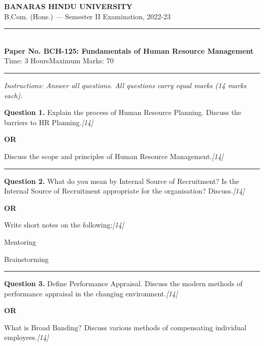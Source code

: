 \documentclass[11pt,a4paper]{article}
\newcommand{\pts}[1]{\hfill   \textit{[#1]}}
\begin{document}
\begin{center}
  {\large\bfseries BANARAS HINDU UNIVERSITY}\\[2pt]
  {\normalsize B.Com. (Hons.) --- Semester II Examination, 2022-23}\\[6pt]
  \rule{0.8\linewidth}{0.5pt}\\[6pt]
  {\large\bfseries Paper No. BCH-125: Fundamentals of Human Resource Management}\\[4pt]
  {\normalsize Time: 3 Hours\hfill Maximum Marks: 70}
\end{center}

\rule{\linewidth}{0.4pt}

\smallskip



\noindent   \textit{Instructions: Answer all questions. All questions carry equal marks (14 marks each).}

\bigskip




\noindent   \textbf{Question 1.}
Explain the process of Human Resource Planning. Discuss the barriers to HR Planning.\pts{14}

\centerline{   \textbf{OR}}

Discuss the scope and principles of Human Resource Management.\pts{14}

\medskip\rule{\linewidth}{0.2pt}




\noindent   \textbf{Question 2.}
What do you mean by Internal Source of Recruitment? Is the Internal Source of Recruitment appropriate for the organisation? Discuss.\pts{14}

\centerline{   \textbf{OR}}

Write short notes on the following:\pts{14}

\begin{parts}
  \item Mentoring
  \item Brainstorming
\end{parts}

\medskip\rule{\linewidth}{0.2pt}




\noindent   \textbf{Question 3.}
Define Performance Appraisal. Discuss the modern methods of performance appraisal in the changing environment.\pts{14}

\centerline{   \textbf{OR}}

What is Broad Banding? Discuss various methods of compensating individual employees.\pts{14}
\end{document}

